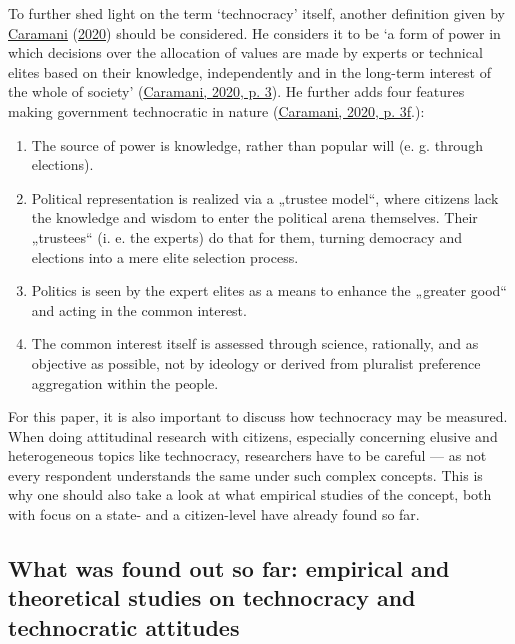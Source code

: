 \documentclass[
  12pt,
  english,
]{article}
\begin{document}
To further shed light on the term `technocracy' itself, another
definition given by
\protect\hyperlink{ref-caramani2020technocratic}{Caramani}
(\protect\hyperlink{ref-caramani2020technocratic}{2020}) should be
considered. He considers it to be `a form of power in which decisions
over the allocation of values are made by experts or technical elites
based on their knowledge, independently and in the long-term interest of
the whole of society'
(\protect\hyperlink{ref-caramani2020technocratic}{Caramani, 2020, p.
3}). He further adds four features making government technocratic in
nature (\protect\hyperlink{ref-caramani2020technocratic}{Caramani, 2020,
p. 3f}.):

\begin{enumerate}
\def\labelenumi{\arabic{enumi}.}
\item
  The source of power is knowledge, rather than popular will (e. g.
  through elections).
\item
  Political representation is realized via a „trustee model``, where
  citizens lack the knowledge and wisdom to enter the political arena
  themselves. Their „trustees`` (i. e. the experts) do that for them,
  turning democracy and elections into a mere elite selection process.
\item
  Politics is seen by the expert elites as a means to enhance the
  „greater good`` and acting in the common interest.
\item
  The common interest itself is assessed through science, rationally,
  and as objective as possible, not by ideology or derived from
  pluralist preference aggregation within the people.
\end{enumerate}

For this paper, it is also important to discuss how technocracy may be
measured. When doing attitudinal research with citizens, especially
concerning elusive and heterogeneous topics like technocracy,
researchers have to be careful --- as not every respondent understands
the same under such complex concepts. This is why one should also take a
look at what empirical studies of the concept, both with focus on a
state- and a citizen-level have already found so far.

\hypertarget{what-was-found-out-so-far-empirical-and-theoretical-studies-on-technocracy-and-technocratic-attitudes}{%
\subsection{What was found out so far: empirical and theoretical studies
on technocracy and technocratic
attitudes}\label{what-was-found-out-so-far-empirical-and-theoretical-studies-on-technocracy-and-technocratic-attitudes}}
\end{document}
